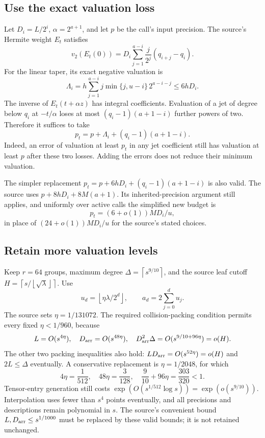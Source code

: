 \documentclass[11pt]{article}
\theoremstyle{remark}
\newcommand{\ceil}[1]{\left\lceil #1\right\rceil}
\newcommand{\floor}[1]{\left\lfloor #1\right\rfloor}
\begin{document}
\subsection{Use the exact valuation loss}
Let \(D_i=L/2^i\), \(\alpha=2^{a+1}\), and let \(p\) be the
call's input precision. The source's Hermite weight \(E_t\) satisfies
\[
 v_2(E_t(0))
 =D_i\sum_{j=1}^{a-i}\frac j{2^j}(q_{i+j}-q_i).
\]
For the linear taper, its exact negative valuation is
\begin{equation}\label{eq:loss}
 \Lambda_i
  =h\sum_{j=1}^{a-i}j\min\{j,u-i\}\,2^{a-i-j}
  \le6hD_i.
\end{equation}
The inverse of \(E_t(t+\alpha z)\) has integral coefficients.
Evaluation of a jet of degree below \(q_i\) at \(-t/\alpha\)
loses at most \((q_i-1)(a+1-i)\) further powers of two.
Therefore it suffices to take
\begin{equation}\label{eq:exact-precision}
 p_t=p+\Lambda_i+(q_i-1)(a+1-i).
\end{equation}
Indeed, an error of valuation at least \(p_t\) in any jet coefficient
still has valuation at least \(p\) after these two losses.
Adding the errors does not reduce their minimum valuation.

The simpler replacement
\(p_t=p+6hD_i+(q_i-1)(a+1-i)\) is also valid.
The source uses \(p+8hD_i+8M(a+1)\).
Its inherited-precision argument still applies, and uniformly over
active calls the simplified new budget is
\[
 p_t=(6+o(1))MD_i/u,
\]
in place of \((24+o(1))MD_i/u\) for the source's stated choices.

\subsection{Retain more valuation levels}
Keep \(r=64\) groups, maximum degree \(\Delta=\ceil{s^{9/10}}\),
and the source leaf cutoff \(H=\ceil{s/\floor{\sqrt\lambda}}\).
Use
\[
 u_d=\floor{\eta\lambda/2^d},\qquad
 a_d=2\sum_{j=0}^d u_j.
\]
The source sets \(\eta=1/131072\).
The required collision-packing condition permits every fixed
\(\eta<1/960\), because
\[
 L=O(s^{4\eta}),\quad D_{\rm arr}=O(s^{48\eta}),\quad
 D_{\rm arr}^2\Delta=O(s^{9/10+96\eta})=o(H).
\]
The other two packing inequalities also hold:
\(LD_{\rm arr}=O(s^{52\eta})=o(H)\) and \(2L\le\Delta\)
eventually. A conservative replacement is
\(\eta=1/2048\), for which
\[
 4\eta=\frac1{512},\quad48\eta=\frac3{128},\quad
 \frac9{10}+96\eta=\frac{303}{320}<1.
\]
Tensor-entry generation still costs
\(\exp(O(s^{1/512}\log s))=\exp(o(s^{9/10}))\).
Interpolation uses fewer than \(s^4\) points eventually, and
all precisions and descriptions remain polynomial in \(s\).
The source's convenient bound \(L,D_{\rm arr}\le s^{1/1000}\)
must be replaced by these valid bounds; it is not retained unchanged.
\end{document}
